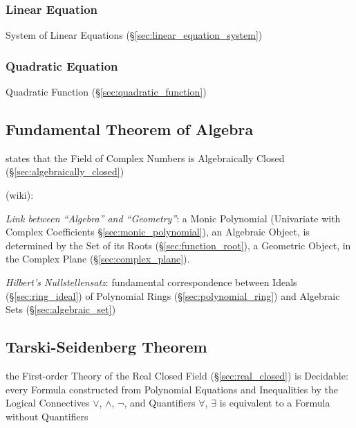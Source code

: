 \subsubsection{Linear Equation}\label{sec:linear_equation}

System of Linear Equations (\S\ref{sec:linear_equation_system})



\subsubsection{Quadratic Equation}\label{sec:quadratic_equation}

Quadratic Function (\S\ref{sec:quadratic_function})



\subsection{Fundamental Theorem of Algebra}
\label{sec:fundamental_algebra_theorem}

states that the Field of Complex Numbers is Algebraically Closed
(\S\ref{sec:algebraically_closed})

(wiki):

\emph{Link between ``Algebra'' and ``Geometry''}: a Monic Polynomial
(Univariate with Complex Coefficients \S\ref{sec:monic_polynomial}), an
Algebraic Object, is determined by the Set of its Roots
(\S\ref{sec:function_root}), a Geometric Object, in the Complex Plane
(\S\ref{sec:complex_plane}).

\emph{Hilbert's Nullstellensatz}: fundamental correspondence between Ideals
(\S\ref{sec:ring_ideal}) of Polynomial Rings (\S\ref{sec:polynomial_ring}) and
Algebraic Sets (\S\ref{sec:algebraic_set})



\subsection{Tarski-Seidenberg Theorem}\label{sec:tarski_seidenberg}

the First-order Theory of the Real Closed Field (\S\ref{sec:real_closed}) is
Decidable: every Formula constructed from Polynomial Equations and Inequalities
by the Logical Connectives $\vee$, $\wedge$, $\neg$, and Quantifiers $\forall$,
$\exists$ is equivalent to a Formula without Quantifiers

